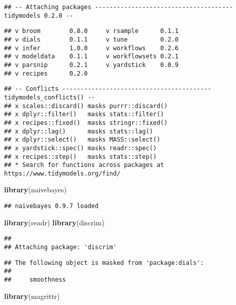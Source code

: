 \documentclass[]{article}
\newenvironment{Shaded}{\begin{snugshade}}{\end{snugshade}}
\newcommand{\KeywordTok}[1]{\textcolor[rgb]{0.13,0.29,0.53}{\textbf{#1}}}
\newcommand{\NormalTok}[1]{#1}
\begin{document}
\begin{verbatim}
## -- Attaching packages -------------------------------------- tidymodels 0.2.0 --
\end{verbatim}

\begin{verbatim}
## v broom        0.8.0     v rsample      0.1.1
## v dials        0.1.1     v tune         0.2.0
## v infer        1.0.0     v workflows    0.2.6
## v modeldata    0.1.1     v workflowsets 0.2.1
## v parsnip      0.2.1     v yardstick    0.0.9
## v recipes      0.2.0
\end{verbatim}

\begin{verbatim}
## -- Conflicts ----------------------------------------- tidymodels_conflicts() --
## x scales::discard() masks purrr::discard()
## x dplyr::filter()   masks stats::filter()
## x recipes::fixed()  masks stringr::fixed()
## x dplyr::lag()      masks stats::lag()
## x dplyr::select()   masks MASS::select()
## x yardstick::spec() masks readr::spec()
## x recipes::step()   masks stats::step()
## * Search for functions across packages at https://www.tidymodels.org/find/
\end{verbatim}

\begin{Shaded}
\begin{Highlighting}[]
\KeywordTok{library}\NormalTok{(naivebayes)}
\end{Highlighting}
\end{Shaded}

\begin{verbatim}
## naivebayes 0.9.7 loaded
\end{verbatim}

\begin{Shaded}
\begin{Highlighting}[]
\KeywordTok{library}\NormalTok{(readr)}
\KeywordTok{library}\NormalTok{(discrim)}
\end{Highlighting}
\end{Shaded}

\begin{verbatim}
## 
## Attaching package: 'discrim'
\end{verbatim}

\begin{verbatim}
## The following object is masked from 'package:dials':
## 
##     smoothness
\end{verbatim}

\begin{Shaded}
\begin{Highlighting}[]
\KeywordTok{library}\NormalTok{(magrittr)}
\end{Highlighting}
\end{Shaded}
\end{document}
